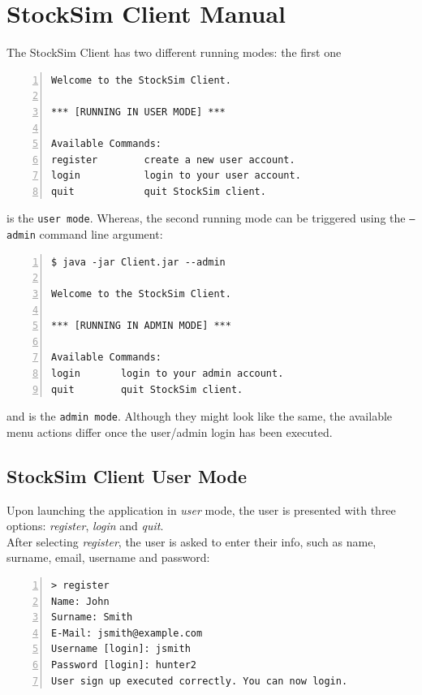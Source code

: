 \chapter{StockSim Client Manual}
The StockSim Client has two different running modes: the first one
\begin{lstlisting}[basicstyle=\footnotesize\ttfamily,language={},numbers=left,keepspaces=true,tabsize=4,
numberstyle=\footnotesize,numbersep=8pt,frame=single]
Welcome to the StockSim Client.

*** [RUNNING IN USER MODE] ***

Available Commands:
register		create a new user account.              
login			login to your user account.             
quit			quit StockSim client. 
\end{lstlisting}
is the \texttt{user mode}. Whereas, the second running mode can be triggered 
using the \texttt{--admin} command line argument:
\begin{lstlisting}[basicstyle=\footnotesize\ttfamily,language={},numbers=left,keepspaces=true,tabsize=4,
numberstyle=\footnotesize,numbersep=8pt,frame=single]
$ java -jar Client.jar --admin

Welcome to the StockSim Client.

*** [RUNNING IN ADMIN MODE] ***

Available Commands:
login		login to your admin account.            
quit		quit StockSim client.
\end{lstlisting}
and is the \texttt{admin mode}. Although they might look like the same, the 
available menu actions differ once the user/admin login has been executed.

\section{StockSim Client User Mode}
Upon launching the application in \textit{user} mode, the user is presented with three options: \textit{register}, \textit{login} and \textit{quit}.\\
After selecting \textit{register}, the user is asked to enter their info, such as name, surname, email, username and password:
\begin{lstlisting}[basicstyle=\footnotesize\ttfamily,language={},numbers=left,keepspaces=true,tabsize=4,
numberstyle=\footnotesize,numbersep=8pt,frame=single]
> register
Name: John
Surname: Smith
E-Mail: jsmith@example.com
Username [login]: jsmith
Password [login]: hunter2
User sign up executed correctly. You can now login.
\end{lstlisting}

